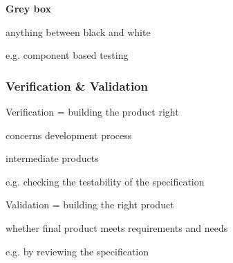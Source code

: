 \textbf{Grey box}
\begin{itemize*}
	\item anything between black and white
	\item e.g. component based testing
\end{itemize*}

\subsubsection{Verification \& Validation}
\begin{itemize*}
	\item Verification = building the product right
	\begin{itemize*}
		\item concerns development process
		\item intermediate products
		\item e.g. checking the testability of the specification
	\end{itemize*}
	\item Validation = building the right product
	\begin{itemize*}
		\item whether final product meets requirements and needs
		\item e.g. by reviewing the specification
	\end{itemize*}
\end{itemize*}




